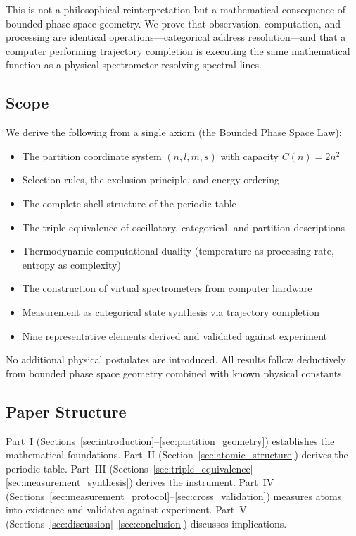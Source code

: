 \documentclass[11pt,a4paper]{article}
\theoremstyle{definition}
\theoremstyle{remark}
\begin{document}
This is not a philosophical reinterpretation but a mathematical consequence of bounded phase space geometry. We prove that observation, computation, and processing are identical operations---categorical address resolution---and that a computer performing trajectory completion is executing the same mathematical function as a physical spectrometer resolving spectral lines.

\subsection{Scope}

We derive the following from a single axiom (the Bounded Phase Space Law):
\begin{itemize}[nosep]
\item The partition coordinate system $(n, l, m, s)$ with capacity $C(n) = 2n^2$
\item Selection rules, the exclusion principle, and energy ordering
\item The complete shell structure of the periodic table
\item The triple equivalence of oscillatory, categorical, and partition descriptions
\item Thermodynamic-computational duality (temperature as processing rate, entropy as complexity)
\item The construction of virtual spectrometers from computer hardware
\item Measurement as categorical state synthesis via trajectory completion
\item Nine representative elements derived and validated against experiment
\end{itemize}

No additional physical postulates are introduced. All results follow deductively from bounded phase space geometry combined with known physical constants.

\subsection{Paper Structure}

Part~I (Sections~\ref{sec:introduction}--\ref{sec:partition_geometry}) establishes the mathematical foundations. Part~II (Section~\ref{sec:atomic_structure}) derives the periodic table. Part~III (Sections~\ref{sec:triple_equivalence}--\ref{sec:measurement_synthesis}) derives the instrument. Part~IV (Sections~\ref{sec:measurement_protocol}--\ref{sec:cross_validation}) measures atoms into existence and validates against experiment. Part~V (Sections~\ref{sec:discussion}--\ref{sec:conclusion}) discusses implications.
\end{document}
